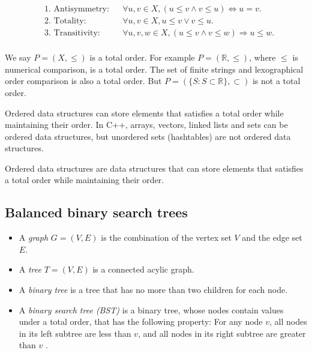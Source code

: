 \documentclass[12pt]{article}
\begin{document}
\begin{align*}
&\text{1. Antisymmetry:} && \forall u, v \in X, (u \le v \land v \le u) \Leftrightarrow u = v. \\
&\text{2. Totality:} && \forall u, v \in X, u \le v \lor v \le u. \\
&\text{3. Transitivity:} && \forall u, v, w \in X, (u \le v \land v \le w) \Rightarrow u \le w.\\
\end{align*}

We say $P = (X, \le)$ is a total order. For example $P = (\mathbb{R}, \le)$, where $\le$ is numerical comparison, is a total order. The set of finite strings and lexographical order comparison is also a total order. But $P = (\{S: S\subset \mathbb{R}\}, \subset)$ is not a total order.

Ordered data structures can store elements that satisfies a total order while maintaining their order. In C++, arrays, vectors, linked lists and sets can be ordered data structures, but unordered sets (hashtables) are not ordered data structures.

\begin{tcolorbox}[title=Definition]
    Ordered data structures are data structures that can store elements that satisfies a total order while maintaining their order.
\end{tcolorbox}

\subsection{Balanced binary search trees}

\begin{itemize} %
    \item A \textit{graph} $G = (V, E)$ is the combination of the vertex set $V$ and the edge set $E$.
    \item A \textit{tree} $T = (V, E)$ is a connected acylic graph.
    \item A \textit{binary tree} is a tree that has no more than two children for each node.
    \item A \textit{binary search tree (BST)} is a binary tree, whose nodes contain values under a total order, that has the following property: For any node $v$, all nodes in its left subtree are less than $v$, and all nodes in its right subtree are greater than $v$ \cite{CLRS}.
\end{itemize}
\end{document}
